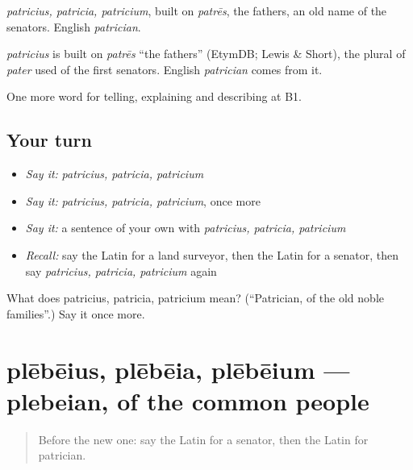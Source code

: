 \emph{patricius, patricia, patricium}, built on \emph{patrēs}, the fathers, an old name of the senators. English \emph{patrician}.

\begin{cousinweb}
\emph{patricius} is built on \emph{patrēs} \textquotedblleft{}the fathers\textquotedblright{} (EtymDB; Lewis \& Short), the plural of \emph{pater} used of the first senators. English \emph{patrician} comes from it.
\end{cousinweb}

\begin{grammarlens}[title={What you've built}]
One more word for telling, explaining and describing at B1.
\end{grammarlens}

\subsection*{Your turn}
\begin{itemize}
\raggedright
  \item \emph{Say it:} \emph{patricius, patricia, patricium}
  \item \emph{Say it:} \emph{patricius, patricia, patricium}, once more
  \item \emph{Say it:} a sentence of your own with \emph{patricius, patricia, patricium}
  \item \emph{Recall:} say the Latin for a land surveyor, then the Latin for a senator, then say \emph{patricius, patricia, patricium} again
\end{itemize}

\begin{tcolorbox}[breakable,colback=teal!4,colframe=teal!35!black,title={Before you move on}]
What does patricius, patricia, patricium mean? (\textquotedblleft{}Patrician, of the old noble families\textquotedblright{}.) Say it once more.
\end{tcolorbox}
\section[plēbēius, plēbēia, plēbēium]{plēbēius, plēbēia, plēbēium — plebeian, of the common people}

\label{lesson:LA-C382-plebeius}



\begin{quote}
Before the new one: say the Latin for a senator, then the Latin for patrician.
\end{quote}

